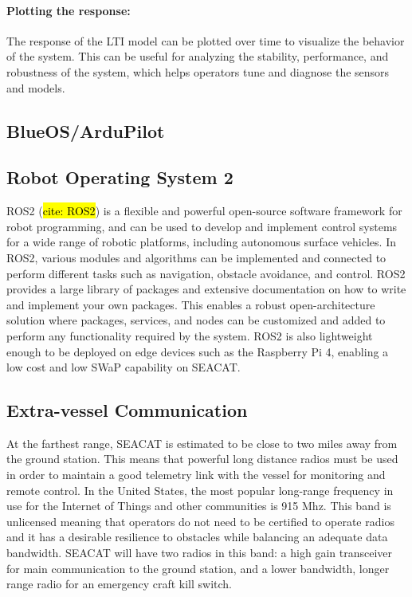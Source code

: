 \paragraph*{Plotting the response:} The response of the LTI model can be plotted over time to visualize the behavior of the system. 
This can be useful for analyzing the stability, performance, and robustness of the system, which helps operators tune and diagnose the sensors and models.

\subsection{BlueOS/ArduPilot}

\subsection{Robot Operating System 2}
ROS2 (\hl{cite: ROS2}) is a flexible and powerful open-source software framework for robot programming, and can be used to develop and implement control systems for a wide range of robotic platforms, including autonomous surface vehicles. 
In ROS2, various modules and algorithms can be implemented and connected to perform different tasks such as navigation, obstacle avoidance, and control. 
ROS2 provides a large library of packages and extensive documentation on how to write and implement your own packages. 
This enables a robust open-architecture solution where packages, services, and nodes can be customized and added to perform any functionality required by the system.
ROS2 is also lightweight enough to be deployed on edge devices such as the Raspberry Pi 4, enabling a low cost and low SWaP capability on SEACAT.

\subsection{Extra-vessel Communication}
At the farthest range, SEACAT is estimated to be close to two miles away from the ground station.
This means that powerful long distance radios must be used in order to maintain a good telemetry link with the vessel for monitoring and remote control.
In the United States, the most popular long-range frequency in use for the Internet of Things and other communities is 915 Mhz.
This band is unlicensed meaning that operators do not need to be certified to operate radios and it has a desirable resilience to obstacles while balancing an adequate data bandwidth.
SEACAT will have two radios in this band: a high gain transceiver for main communication to the ground station, and a lower bandwidth, longer range radio for an emergency craft kill switch.

